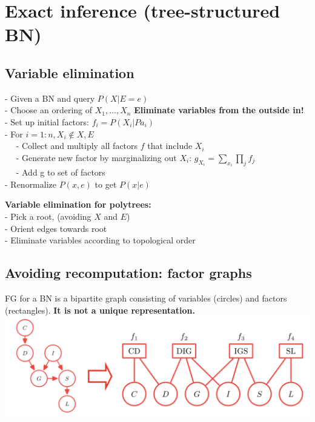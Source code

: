 \section{Exact inference (tree-structured BN) }
\subsection{Variable elimination}
- Given a BN and query $P(X|E=e)$\\
- Choose an ordering of $X_1, ..., X_n$ \textbf{Eliminate variables from the outside in!}\\
- Set up initial factors: $f_i=P(X_i|Pa_i)$\\
- For $i=1:n, X_i \notin {X, E}$\\
$\quad$ - Collect and multiply all factors $f$ that include $X_i$\\
$\quad$ - Generate new factor by marginalizing out $X_i$:
        $g_X_i = \sum_{x_i}\prod_j f_j$\\
$\quad$ - Add g to set of factors\\
- Renormalize $P(x,e)$ to get $P(x|e)$

\textbf{Variable elimination for polytrees:}\\
- Pick a root, (avoiding $X$ and $E$)\\
- Orient edges towards root\\
- Eliminate variables according to topological order


\subsection{Avoiding recomputation: factor graphs}
FG for a BN is a bipartite graph consisting of variables (circles) and factors (rectangles). \textbf{It is not a unique representation.}\\
\includegraphics[scale=0.25]{factor_graph.png}

